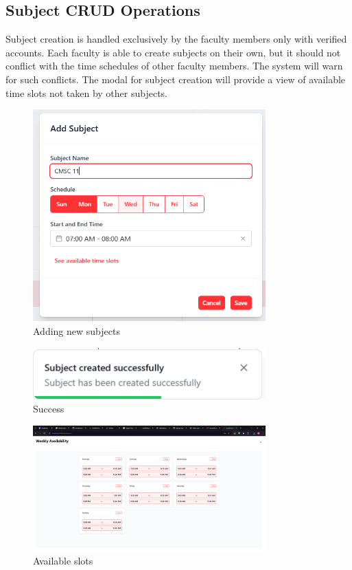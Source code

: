 \subsection{Subject CRUD Operations}
Subject creation is handled exclusively by the faculty members only with verified accounts. Each faculty is able to create subjects on their own, but it should not conflict with the time schedules of other faculty members. The system will warn for such conflicts. The modal for subject creation will provide a view of available time slots not taken by other subjects.
\begin{figure}[h] %
	\centering
	\includegraphics[width=0.8\textwidth]{figures/chapter4/subject_add.png} %
	\caption{Adding new subjects}
	\label{fig:subject_add}
\end{figure}
\begin{figure}[h] %
	\centering
	\includegraphics[width=0.8\textwidth]{figures/chapter4/subject_add_success.png} %
	\caption{Success}
	\label{fig:subject_add_success}
\end{figure}
\clearpage
\begin{figure}[h] %
	\centering
	\includegraphics[width=0.8\textwidth]{figures/chapter4/subject_availability.png} %
	\caption{Available slots}
	\label{fig:subject_availability}
\end{figure}
